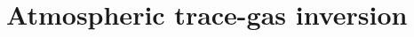 \documentclass{beamer}
\begin{document}
















\section{Atmospheric trace-gas inversion}


\end{document}
